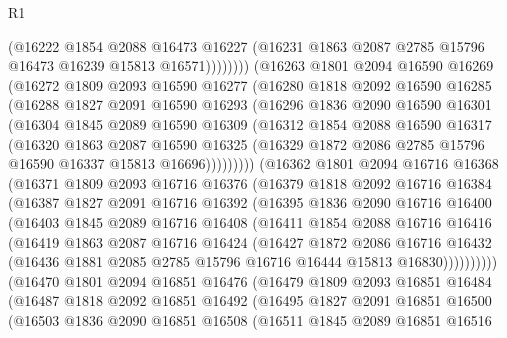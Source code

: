 \begin{lexlean}{R1}
\begin{coremodule}
                (@16222
                  @1854
                  @2088
                  @16473
                  @16227
                  (@16231 @1863 @2087 @2785 @15796 @16473 @16239 @15813 @16571))))))))
    (@16263
      @1801
      @2094
      @16590
      @16269
      (@16272
        @1809
        @2093
        @16590
        @16277
        (@16280
          @1818
          @2092
          @16590
          @16285
          (@16288
            @1827
            @2091
            @16590
            @16293
            (@16296
              @1836
              @2090
              @16590
              @16301
              (@16304
                @1845
                @2089
                @16590
                @16309
                (@16312
                  @1854
                  @2088
                  @16590
                  @16317
                  (@16320
                    @1863
                    @2087
                    @16590
                    @16325
                    (@16329 @1872 @2086 @2785 @15796 @16590 @16337 @15813 @16696)))))))))
    (@16362
      @1801
      @2094
      @16716
      @16368
      (@16371
        @1809
        @2093
        @16716
        @16376
        (@16379
          @1818
          @2092
          @16716
          @16384
          (@16387
            @1827
            @2091
            @16716
            @16392
            (@16395
              @1836
              @2090
              @16716
              @16400
              (@16403
                @1845
                @2089
                @16716
                @16408
                (@16411
                  @1854
                  @2088
                  @16716
                  @16416
                  (@16419
                    @1863
                    @2087
                    @16716
                    @16424
                    (@16427
                      @1872
                      @2086
                      @16716
                      @16432
                      (@16436 @1881 @2085 @2785 @15796 @16716 @16444 @15813 @16830))))))))))
    (@16470
      @1801
      @2094
      @16851
      @16476
      (@16479
        @1809
        @2093
        @16851
        @16484
        (@16487
          @1818
          @2092
          @16851
          @16492
          (@16495
            @1827
            @2091
            @16851
            @16500
            (@16503
              @1836
              @2090
              @16851
              @16508
              (@16511
                @1845
                @2089
                @16851
                @16516

\end{coremodule}
\end{lexlean}
